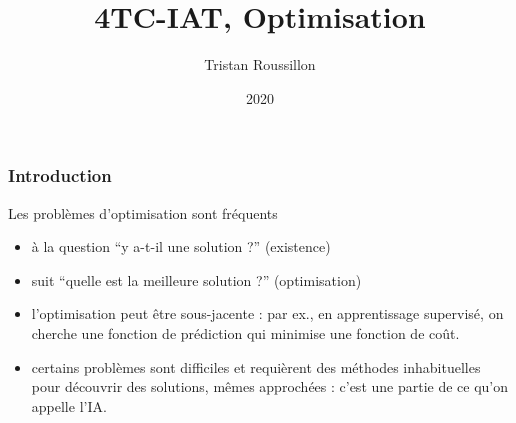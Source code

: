 \documentclass{beamer}
\title[]
 {4TC-IAT, Optimisation}
\author[T. Roussillon]
 {Tristan Roussillon}
\date{2020}
\institute{INSA Lyon, TC}
\begin{document}
\begin{frame}
  \titlepage
\end{frame}

\begin{frame}
  \frametitle{Introduction}

  \begin{block}{Les problèmes d'optimisation sont fréquents}
  \begin{itemize}
  \item à la question ``y a-t-il une solution ?'' (existence)
  \item suit ``quelle est la meilleure solution ?'' (optimisation)
  \item l'optimisation peut être sous-jacente : par ex., en apprentissage supervisé, on cherche
    une fonction de prédiction qui minimise une fonction de coût.
  \item certains problèmes sont difficiles et requièrent des méthodes inhabituelles pour découvrir
    des solutions, mêmes approchées : c'est une partie de ce qu'on appelle l'IA.
  \end{itemize}
  \end{block}
  
\end{frame}
\end{document}
